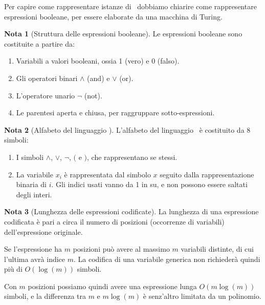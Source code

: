 \documentclass[12pt]{article}
\theoremstyle{definition}
\newtheorem*{mynote}{Nota}
\begin{document}
Per capire come rappresentare istanze di \SAT\ dobbiamo chiarire come rappresentare espressioni booleane,
per essere elaborate da una macchina di Turing.

\begin{mynote}[Struttura delle espressioni booleane]
Le espressioni booleane sono costituite a partire da:

\begin{enumerate}
  \item Variabili a valori booleani, ossia 1 (vero) e 0 (falso).
  \item Gli operatori binari \(\land\) (and) e \(\lor\) (or).
  \item L'operatore unario \(\lnot\) (not).
  \item Le parentesi aperta e chiusa, per raggruppare sotto-espressioni.
\end{enumerate}

\end{mynote}

\begin{mynote}[Alfabeto del linguaggio \SAT]
L'alfabeto del linguaggio \SAT\ \`e costituito da 8 simboli:

\begin{enumerate}
  \item I simboli \(\land\), \(\lor\), \(\lnot\), \((\) e \()\), che rappresentano se stessi.
  \item La variabile \(x_i\) \`e rappresentata dal simbolo \(x\) seguito dalla rappresentazione binaria di \(i\).
        Gli indici usati vanno da 1 in su, e non possono essere saltati degli interi.
\end{enumerate}

\end{mynote}

\begin{mynote}[Lunghezza delle espressioni codificate]
La lunghezza di una espressione codificata \`e pari a circa il  numero di posizioni (occorrenze di variabili)
dell'espressione originale.

Se l'espressione ha \(m\) posizioni pu\`o avere al massimo \(m\) variabili distinte, di cui l'ultima avr\`a indice \(m\).
La codifica di una variabile generica non richieder\`a quindi pi\`u di \(O(\log(m))\) simboli.

Con \(m\) posizioni possiamo quindi avere una espressione lunga \(O(m\log(m))\) simboli,
e la differenza tra \(m\) e \(m\log(m)\) \`e senz'altro limitata da un polinomio.
\end{mynote}
\end{document}

